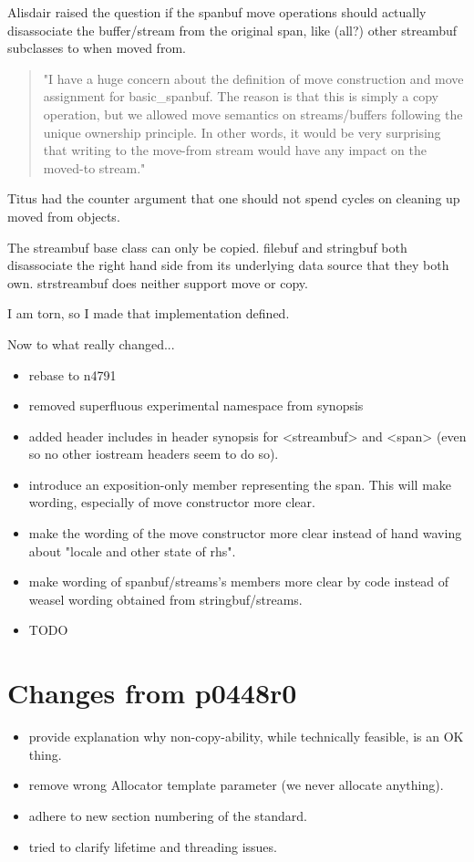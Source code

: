 \documentclass[ebook,11pt,article]{memoir}
\begin{document}
Alisdair raised the question if the spanbuf move operations should actually disassociate the buffer/stream from the original span, like (all?) other streambuf subclasses to when moved from. 
\begin{quote}
{"I have a huge concern about the definition of move construction and move assignment
for basic_spanbuf.  The reason is that this is simply a copy operation, but we allowed
move semantics on streams/buffers following the unique ownership principle.  In other
words, it would be very surprising that writing to the move-from stream would have any
impact on the moved-to stream."}
\end{quote}

Titus had the counter argument that one should not spend cycles on cleaning up moved from objects.
 
The streambuf base class can only be copied. filebuf and stringbuf both disassociate the right hand side from its underlying data source that they both own. strstreambuf does neither support move or copy. 

I am torn, so I made that implementation defined.

Now to what really changed...
\begin{itemize}
\item rebase to n4791
\item removed superfluous experimental namespace from synopsis
\item added header includes in header synopsis for <streambuf> and <span> (even so no other iostream headers seem to do so).
\item introduce an exposition-only member  representing the span. This will make wording, especially of move constructor more clear. 
\item make the wording of the move constructor more clear instead of hand waving about "locale and other state of rhs".
\item make wording of spanbuf/streams's members more clear by code instead of weasel wording obtained from stringbuf/streams.
\item TODO
\end{itemize}



\section{Changes from p0448r0}
\begin{itemize}
\item provide explanation why non-copy-ability, while technically feasible, is an OK thing.
\item remove wrong Allocator template parameter (we never allocate anything).
\item adhere to new section numbering of the standard.
\item tried to clarify lifetime and threading issues.
\end{itemize}
\end{document}
